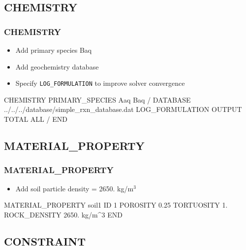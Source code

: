 \documentclass{beamer}
\newcommand\magentacomment[1]{{{\color{magenta} #1}}}
\begin{document}
\subsection{CHEMISTRY}

\begin{frame}\frametitle{CHEMISTRY}

\begin{itemize}
  \item Add primary species Baq
  \item Add geochemistry database
  \item Specify \verb|LOG_FORMULATION| to improve solver convergence
\end{itemize}

\begin{semiverbatim}
CHEMISTRY
  PRIMARY_SPECIES
    Aaq
    \magentacomment{Baq}
  /
  \magentacomment{DATABASE ../../../database/simple_rxn_database.dat}
  \magentacomment{LOG_FORMULATION}
  OUTPUT
    TOTAL
    ALL
  /
END
\end{semiverbatim}

\end{frame}

\subsection{MATERIAL\_PROPERTY}

\begin{frame}\frametitle{MATERIAL\_PROPERTY}

\begin{itemize}
  \item Add soil particle density = 2650. kg/m$^3$
\end{itemize}

\begin{semiverbatim}

MATERIAL_PROPERTY soil1
  ID 1
  POROSITY 0.25
  TORTUOSITY 1.
  \magentacomment{ROCK_DENSITY 2650. kg/m^3}
END

\end{semiverbatim}

\end{frame}

\subsection{CONSTRAINT}
\end{document}
